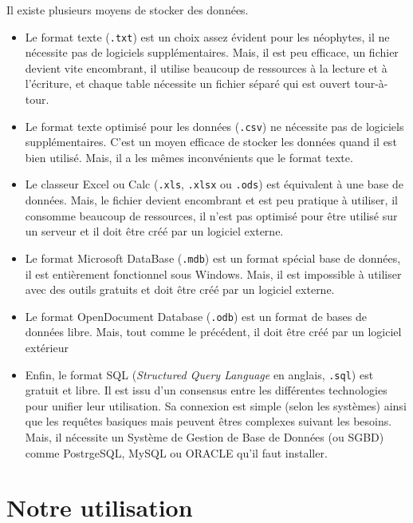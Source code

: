 Il existe plusieurs moyens de stocker des données.
\begin{itemize}
	\item Le format texte (\verb-.txt-) est un choix assez évident pour les néophytes, il ne nécessite pas de logiciels supplémentaires. Mais, il est peu efficace, un fichier devient vite encombrant, il utilise beaucoup de ressources à la lecture et à l'écriture, et chaque table nécessite un fichier séparé qui est ouvert tour-à-tour.
	
	\item Le format texte optimisé pour les données (\verb-.csv-) ne nécessite pas de logiciels supplémentaires. C'est un moyen efficace de stocker les données quand il est bien utilisé. Mais, il a les mêmes inconvénients que le format texte.
	
	\item Le classeur Excel ou Calc (\verb-.xls-, \verb-.xlsx- ou \verb-.ods-) est équivalent à une base de données. Mais, le fichier devient encombrant et est peu pratique à utiliser, il consomme beaucoup de ressources, il n'est pas optimisé pour être utilisé sur un serveur et il doit être créé par un logiciel externe.
	
	\item Le format Microsoft DataBase (\verb-.mdb-) est un format spécial base de données, il est entièrement fonctionnel sous Windows. Mais, il est impossible à utiliser avec des outils gratuits et doit être créé par un logiciel externe.
	
	\item Le format OpenDocument Database (\verb-.odb-) est un format de bases de données libre. Mais, tout comme le précédent, il doit être créé par un logiciel extérieur
	
	\item Enfin, le format SQL (\emph{Structured Query Language} en anglais, \verb-.sql-) est gratuit et libre. Il est issu d'un consensus entre les différentes technologies pour unifier leur utilisation. Sa connexion est simple (selon les systèmes) ainsi que les requêtes basiques mais peuvent êtres complexes suivant les besoins. Mais, il nécessite un Système de Gestion de Base de Données (ou SGBD) comme PostrgeSQL, MySQL ou ORACLE qu'il faut installer.
\end{itemize}

\section{Notre utilisation}

